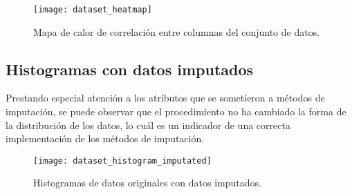 \begin{figure}[htbp]
	\centering
	\texttt{[image: dataset\_heatmap]}
	\caption{Mapa de calor de correlación entre columnas del conjunto de datos.}
	\label{Fig: HeatMap}
\end{figure}

\subsection{Histogramas con datos imputados}
Prestando especial atención a los atributos que se sometieron a métodos de imputación, se puede observar que el procedimiento no ha cambiado la forma de la distribución de los datos, lo cuál es un indicador de una correcta implementación de los métodos de imputación.

\begin{figure}[htbp]
	\centering
	\texttt{[image: dataset\_histogram\_imputated]}
	\caption{Histogramas de datos originales con datos imputados.}
	\label{Fig: HistIM}
\end{figure}
